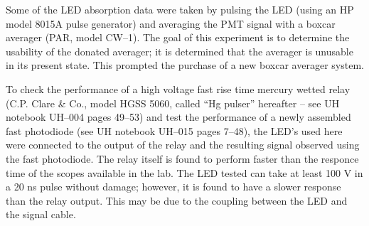 \label{Hg pulser and fast PD section}
Some of the LED absorption data were taken by pulsing the LED (using an HP model 8015A pulse generator) and averaging the PMT signal with a boxcar averager (PAR, model CW--1). The goal of this experiment is to determine the usability of the donated averager; it is determined that the averager is unusable in its present state. This prompted the purchase of a new boxcar averager system.

To check the performance of a high voltage fast rise time mercury wetted relay (C.P. Clare \& Co., model HGSS 5060, called ``Hg pulser'' hereafter  -- see UH notebook UH--004 pages 49--53) and test the performance of a newly assembled fast photodiode (see UH notebook UH--015 pages 7--48), the LED's used here were connected to the output of the relay and the resulting signal observed using the fast photodiode. The relay itself is found to perform faster than the responce time of the scopes available in the lab. The LED tested can take at least 100 V in a 20 ns pulse without damage; however, it is found to have a slower response than the relay output. This may be due to the coupling between the LED and the signal cable.

